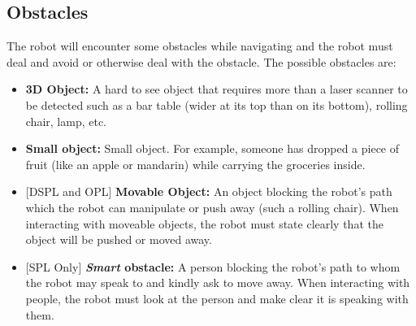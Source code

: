 \subsection{Obstacles}
The robot will encounter some obstacles while navigating and the robot must deal and avoid or otherwise deal with the obstacle. 
The possible obstacles are:
\begin{itemize}
  \item \textbf{3D Object:} A hard to see object that requires more than a laser scanner to be detected such as a bar table (wider at its top than on its bottom), rolling chair, lamp, etc.

  \item \textbf{Small object:} Small object. For example, someone has dropped a piece of fruit (like an apple or mandarin) while carrying the groceries inside.

  \item {[DSPL and OPL]} \textbf{Movable Object:} An object blocking the robot's path which the robot can manipulate or push away (such a rolling chair). When interacting with moveable objects, the robot must state clearly that the object will be pushed or moved away.

  \item {[SPL Only]} \textbf{\textit{Smart} obstacle:} A person blocking the robot's path to whom the robot may speak to and kindly ask to move away. When interacting with people, the robot must look at the person and make clear it is speaking with them.
\end{itemize}


